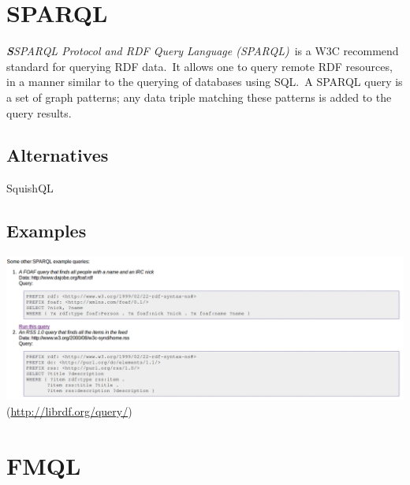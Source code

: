 \documentclass[DIV=calc, paper=a4, fontsize=12pt, onecolumn]{scrartcl}	 %
\newcommand{\initial}[1]{ %
\lettrine[lines=3,lhang=0.3,nindent=0em,slope=0em]{
\color{DarkBlue}
{\textbf{\textit{#1}}}}{}}
\begin{document}
{%

\section[SPARQL Protocol and RDF Query Language (SPARQL)]{SPARQL}
  \label{sec:sparql}

\initial{S}\textit{SPARQL Protocol and RDF Query Language (SPARQL)}\
		is a W3C recommend standard for querying RDF data.\
		It allows one to query remote RDF resources, in a manner similar to the querying of databases using SQL.\
		A SPARQL query is a set of graph patterns; any data triple matching these patterns is added to the query results.\
                   \cite{Jarrar_mashql:_2008}     
		
		\subsection{Alternatives}
		SquishQL

		\subsection{Examples}

                    \includegraphics[scale=0.3]{sparql.png}\\
                   (\url{http://librdf.org/query/})\
                     


\section[FileMan Query Language (FMQL)]{FMQL}
  \label{sec:fmql}

}
\end{document}
